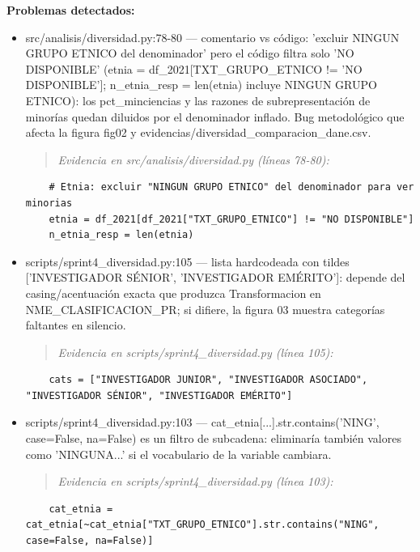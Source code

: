 \begin{tcolorbox}[riesgo]
\textbf{Problemas detectados:}
\begin{itemize}
  \item src/analisis/diversidad.py:78-80 --- comentario vs código: 'excluir NINGUN GRUPO ETNICO del denominador' pero el código filtra solo 'NO DISPONIBLE' (etnia = df\_2021[TXT\_GRUPO\_ETNICO != 'NO DISPONIBLE']; n\_etnia\_resp = len(etnia) incluye NINGUN GRUPO ETNICO): los pct\_minciencias y las razones de subrepresentación de minorías quedan diluidos por el denominador inflado. Bug metodológico que afecta la figura fig02 y evidencias/diversidad\_comparacion\_dane.csv.
\begin{quote}\footnotesize\ttfamily
\noindent\emph{Evidencia en src/analisis/diversidad.py (líneas 78-80):}
\end{quote}
\begin{lstlisting}
    # Etnia: excluir "NINGUN GRUPO ETNICO" del denominador para ver minorias
    etnia = df_2021[df_2021["TXT_GRUPO_ETNICO"] != "NO DISPONIBLE"]
    n_etnia_resp = len(etnia)
\end{lstlisting}

  \item scripts/sprint4\_diversidad.py:105 --- lista hardcodeada con tildes ['INVESTIGADOR SÉNIOR', 'INVESTIGADOR EMÉRITO']: depende del casing/acentuación exacta que produzca Transformacion en NME\_CLASIFICACION\_PR; si difiere, la figura 03 muestra categorías faltantes en silencio.
\begin{quote}\footnotesize\ttfamily
\noindent\emph{Evidencia en scripts/sprint4\_diversidad.py (línea 105):}
\end{quote}
\begin{lstlisting}
    cats = ["INVESTIGADOR JUNIOR", "INVESTIGADOR ASOCIADO", "INVESTIGADOR SÉNIOR", "INVESTIGADOR EMÉRITO"]
\end{lstlisting}

  \item scripts/sprint4\_diversidad.py:103 --- cat\_etnia[...].str.contains('NING', case=False, na=False) es un filtro de subcadena: eliminaría también valores como 'NINGUNA...' si el vocabulario de la variable cambiara.
\begin{quote}\footnotesize\ttfamily
\noindent\emph{Evidencia en scripts/sprint4\_diversidad.py (línea 103):}
\end{quote}
\begin{lstlisting}
    cat_etnia = cat_etnia[~cat_etnia["TXT_GRUPO_ETNICO"].str.contains("NING", case=False, na=False)]
\end{lstlisting}


\end{itemize}
\end{tcolorbox}
